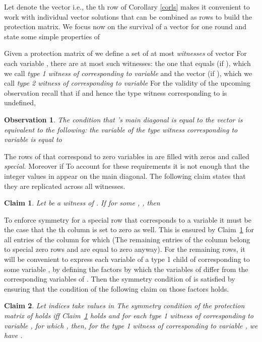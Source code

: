 \documentclass[11pt]{article}\usepackage{amsmath}
\newtheorem{claim}{Claim}[section]
\newtheorem{observation}{Observation}[section]
\begin{document}
Let  denote the vector  i.e., the th row of  
Corollary  \ref{corls} makes  it  convenient to  work with  individual
vector solutions that can be  combined as rows to build the protection
matrix. 
 We focus now on the survival of
a vector   for one  round and state  some simple properties of  


Given a protection matrix  of  
we define a set of at most  {\em
  witnesses} of vector  For each variable ,  there are at most
 such witnesses: the one that equals 
(if  ),   which we  call \emph{type  1 witness  of 
  corresponding to variable } and the vector 
(if ), which we call \emph{type 2 witness of 
  corresponding to  variable } For the validity  of the upcoming
observation recall  that if   and hence the  type  witness
corresponding to  is undefined,  

\begin{observation}\label{obs_diag}
The condition that 's main diagonal is equal to the vector  is
equivalent to the following: the variable  of the type  witness
 corresponding to variable  is equal to 
\end{observation}


The rows of  that correspond to zero variables in  are filled 
with zeros and called {\em
  special.}  
Moreover if   
To account for these requirements it is not enough that the integer values
in  appear on the main diagonal. The following claim states that
they are replicated across  all witnesses. 

\begin{claim}\label{simplefact1}
Let   be a witness  of  .  If  for some , , then 
\end{claim}


To enforce symmetry  for a special row  that corresponds
to a  variable  it must be  the case that the  th column is
set to  zero as well.  This is ensured by  Claim~\ref{simplefact1} for
all  entries   of  the column  for  which   (The
remaining entries  of the column belong  to special zero  rows and are
equal to zero anyway). 
For  the remaining rows, it will be convenient to 
  express  each variable of a type 1   child of  corresponding
to some variable  , by defining the factors by which  the variables of 
differ from the  corresponding variables of . Then  the symmetry condition of
 is satisfied by ensuring that  the condition of the following claim on those
factors holds. 


\begin{claim}\label{simplefact2}
Let indices  take values in  The symmetry condition of the
protection  matrix  of    holds  iff  Claim~\ref{simplefact1} holds
 and for  each type  1  witness     of  
corresponding to variable , for which 
,  
then, for  the type 1 witness   of   corresponding to variable
, we have .
\end{claim}
\end{document}

